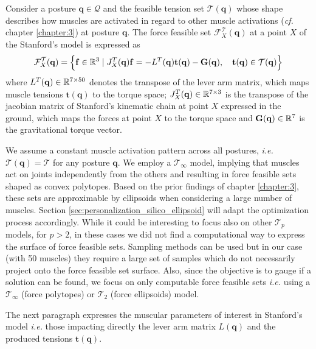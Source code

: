 Consider a posture $\mathbf{q}\in\mathcal{Q}$ and the feasible tension set $\mathcal{T}(\mathbf{q})$ whose shape describes how muscles are activated in regard to other muscle activations (\emph{cf.} chapter \ref{chapter:3}) at posture $\mathbf{q}$. The force feasible set $\mathcal{F}_X^{\mathcal{T}}(\mathbf{q})$ at a point $X$ of the Stanford's model is expressed as
\begin{align*}
    \mathcal{F}^{\mathcal{T}}_X(\mathbf{q}) = \left\{ \mathbf{f}\in\mathbb{R}^3 \mid J^T_X(\mathbf{q})\mathbf{f} = -L^T(\mathbf{q})\mathbf{t}(\mathbf{q}) - \mathbf{G}(\mathbf{q}),\quad\mathbf{t}(\mathbf{q})\in \mathcal{T}(\mathbf{q}) \right\}
\end{align*}
where $L^T(\mathbf{q})\in\mathbb{R}^{7\times 50}$ denotes the transpose of the lever arm matrix, which maps muscle tensions $\mathbf{t}(\mathbf{q})$ to the torque space; $J_X^T(\mathbf{q})\in\mathbb{R}^{7\times 3}$ is the transpose of the jacobian matrix of Stanford's kinematic chain at point $X$ expressed in the ground, which maps the forces at point $X$ to the torque space and $\mathbf{G}(\mathbf{q})\in\mathbb{R}^7$ is the gravitational torque vector.

We assume a constant muscle activation pattern across all postures, \emph{i.e.} $\mathcal{T}(\mathbf{q}) = \mathcal{T}$ for any posture $\mathbf{q}$.
We employ a $\mathcal{T}_{\infty}$ model, implying that muscles act on joints independently from the others and resulting in force feasible sets shaped as convex polytopes. Based on the prior findings of chapter \ref{chapter:3}, these sets are approximable by ellipsoids when considering a large number of muscles. Section \ref{sec:personalization_silico_ellipsoid} will adapt the optimization process accordingly. While it could be interesting to focus also on other $\mathcal{T}_p$ models, for $p > 2$, in these cases we did not find a computational way to express the surface of force feasible sets. Sampling methods can be used but in our case (with 50 muscles) they require a large set of samples which do not necessarily project onto the force feasible set surface. Also, since the objective is to gauge if a solution can be found, we focus on only computable force feasible sets \emph{i.e.} using a $\mathcal{T}_{\infty}$ (force polytopes) or $\mathcal{T}_2$ (force ellipsoids) model.

The next paragraph expresses the muscular parameters of interest in Stanford's model \emph{i.e.} those impacting directly the lever arm matrix $L(\mathbf{q})$ and the produced tensions $\mathbf{t}(\mathbf{q})$.

